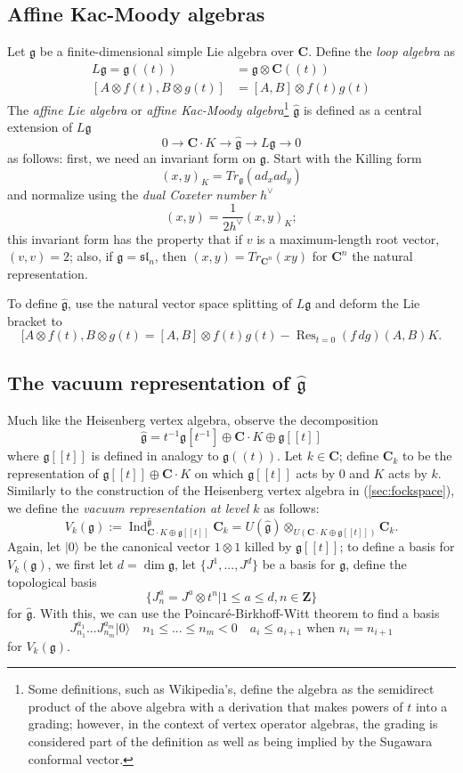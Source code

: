 \documentclass{article}
\newcommand{\CC}{\mathbold{C}}
\newcommand{\ZZ}{\mathbold{Z}}
\newcommand{\vac}{|0\rangle}
\newcommand{\gf}{\mathfrak{g}}
\newcommand{\ghat}{\widehat{\mathfrak{g}}}
\DeclareMathOperator{\Res}{Res}
\DeclareMathOperator{\Ind}{Ind}
\begin{document}
\subsection{Affine Kac-Moody algebras}
Let $\gf$ be a finite-dimensional simple Lie algebra over $\CC$.  Define the \textit{loop algebra} as
\begin{align*}
  L\gf=\gf((t))&=\gf \otimes \CC((t))\\
  [A \otimes f(t),B \otimes g(t)]&=[A,B] \otimes f(t)g(t)
\end{align*}
The \textit{affine Lie algebra} or \textit{affine Kac-Moody algebra}\footnote{Some definitions, such as Wikipedia's, define the algebra as the semidirect product of the above algebra with a derivation that makes powers of $t$ into a grading; however, in the context of vertex operator algebras, the grading is considered part of the definition as well as being implied by the Sugawara conformal vector.} $\ghat$ is defined as a central extension of $L\gf$
\[0 \rightarrow \CC \cdot K \rightarrow \ghat \rightarrow L\gf \rightarrow 0 \]
as follows: first, we need an invariant form on $\gf$.  Start with the Killing form
\[(x,y)_K=Tr_\gf(ad_xad_y) \]
and normalize using the \textit{dual Coxeter number} $h^\vee$
\[(x,y)=\frac{1}{2h^\vee}(x,y)_K; \]
this invariant form has the property that if $v$ is a maximum-length root vector, $(v,v)=2$; also, if $\gf=\mathfrak{sl}_n$, then $(x,y)=Tr_{\CC^n}(xy)$ for $\CC^n$ the natural representation.

To define $\ghat$, use the natural vector space splitting of $L\gf$ and deform the Lie bracket to
\[[A \otimes f(t),B \otimes g(t) = [A,B] \otimes f(t)g(t) - \Res_{t=0}(f\,dg) (A,B)K. \]

\subsection{The vacuum representation of $\ghat$}
Much like the Heisenberg vertex algebra, observe the decomposition
\[\ghat = t^{-1}\gf[t^{-1}] \oplus \CC \cdot K \oplus \gf[[t]] \]
where $\gf[[t]]$ is defined in analogy to $\gf((t))$.  Let $k \in \CC$; define $\CC_k$ to be the representation of $\gf[[t]] \oplus \CC \cdot K$ on which $\gf[[t]]$ acts by $0$ and $K$ acts by $k$.  Similarly to the construction of the Heisenberg vertex algebra in (\ref{sec:fockspace}), we define the \textit{vacuum representation at level $k$} as follows:
\[V_k(\gf):=\Ind_{\CC \cdot K \oplus \gf[[t]]}^{\ghat}\CC_k = U(\ghat) \otimes_{U(\CC \cdot K \oplus \gf[[t]])}\CC_k. \]
Again, let $\vac$ be the canonical vector $1 \otimes 1$ killed by $\gf[[t]]$; to define a basis for $V_k(\gf)$, we first let $d=\dim \gf$, let $\{J^1,...,J^d\}$ be a basis for $\gf$, define the topological basis
\[\{J^a_n=J^a \otimes t^n|1 \le a \le d, n \in \ZZ \} \]
for $\ghat$.  With this, we can use the Poincaré-Birkhoff-Witt theorem to find a basis
\[J^{a_1}_{n_1}...J^{a_m}_{n_m}\vac \quad n_1 \le ... \le n_m < 0 \quad a_i \le a_{i+1} \textrm{ when }n_i=n_{i+1} \]
for $V_k(\gf)$.
\end{document}
